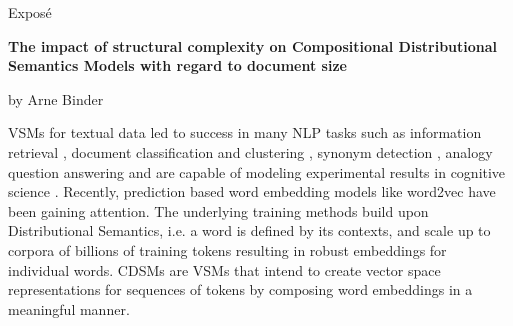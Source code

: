 
\begin{center}
	\huge{Expos\'e} 
	\vspace{0.5cm}
	 
	\large{\bf{The impact of structural complexity on Compositional Distributional Semantics Models %
			with regard to document size}} 
	\vspace{0.5cm}

	by Arne Binder \\
\end{center}

\vspace{0.5cm}
\normalsize

\acfp{VSM} for textual data \autocite{salton_vector_1975} led to success in many \ac{NLP} tasks %
such as information retrieval \autocite{dierk_smart_1971,deerwester_indexing_1990}, document classification and clustering , synonym detection \autocite{rapp_word_2003}, analogy question answering \autocite{turney_similarity_2006} and are capable of modeling experimental results in cognitive science \autocite{landauer_solution_1997,mcdonald_testing_2001}.
Recently, prediction based word embedding models like word2vec \autocite{mikolov_efficient_2013} have been gaining attention.%
The underlying training methods build upon Distributional Semantics, i.e. a word is defined by its contexts, and scale up to %
corpora of billions of training tokens \autocite{mikolov_distributed_2013} resulting in robust embeddings for individual words. 
\acfp{CDSM} are \acp{VSM} that intend to create vector space representations for sequences of tokens by composing word embeddings in a meaningful manner. 

